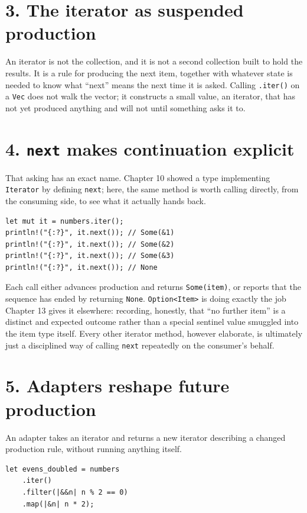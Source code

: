 \documentclass[11pt]{book}
\begin{document}
\section*{3. The iterator as suspended production}

An iterator is not the collection, and it is not a second collection built to hold the results. It is a rule for producing the next item, together with whatever state is needed to know what ``next'' means the next time it is asked. Calling \texttt{.iter()} on a \texttt{Vec} does not walk the vector; it constructs a small value, an iterator, that has not yet produced anything and will not until something asks it to.

\section*{4. \texttt{next} makes continuation explicit}

That asking has an exact name. Chapter 10 showed a type implementing \texttt{Iterator} by defining \texttt{next}; here, the same method is worth calling directly, from the consuming side, to see what it actually hands back.

\begin{lstlisting}
let mut it = numbers.iter();
println!("{:?}", it.next()); // Some(&1)
println!("{:?}", it.next()); // Some(&2)
println!("{:?}", it.next()); // Some(&3)
println!("{:?}", it.next()); // None
\end{lstlisting}

Each call either advances production and returns \texttt{Some(item)}, or reports that the sequence has ended by returning \texttt{None}. \texttt{Option<Item>} is doing exactly the job Chapter 13 gives it elsewhere: recording, honestly, that ``no further item'' is a distinct and expected outcome rather than a special sentinel value smuggled into the item type itself. Every other iterator method, however elaborate, is ultimately just a disciplined way of calling \texttt{next} repeatedly on the consumer's behalf.

\section*{5. Adapters reshape future production}

An adapter takes an iterator and returns a new iterator describing a changed production rule, without running anything itself.

\begin{lstlisting}
let evens_doubled = numbers
    .iter()
    .filter(|&&n| n % 2 == 0)
    .map(|&n| n * 2);
\end{lstlisting}
\end{document}
